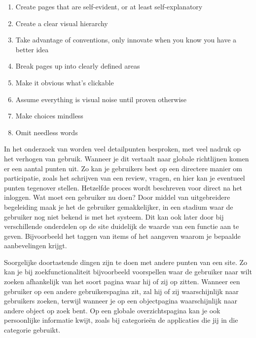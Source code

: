 \documentclass[a4paper, 10pt, pdftex]{report}
\begin{document}
      \begin{enumerate}
        \item Create pages that are self-evident, or at least self-explanatory
        \item Create a clear visual hierarchy
        \item Take advantage of conventions, only innovate when you know you have a better idea
        \item Break pages up into clearly defined areas
        \item Make it obvious what's clickable
        \item Assume everything is visual noise until proven otherwise
        \item Make choices mindless
        \item Omit needless words
      \end{enumerate}

    In het onderzoek van \citeauthor{Alfrink2008} worden veel detailpunten besproken, met veel nadruk op het verhogen van gebruik. Wanneer je dit vertaalt naar globale richtlijnen komen er een aantal punten uit. Zo kan je gebruikers best op een directere manier om participatie, zoals het schrijven van een review, vragen, en hier kan je eventueel punten tegenover stellen. Hetzelfde proces wordt beschreven voor direct na het inloggen. Wat moet een gebruiker nu doen? Door middel van uitgebreidere begeleiding maak je het de gebruiker gemakkelijker, in een stadium waar de gebruiker nog niet bekend is met het systeem. Dit kan ook later door bij verschillende onderdelen op de site duidelijk de waarde van een functie aan te geven. Bijvoorbeeld het taggen van items of het aangeven waarom je bepaalde aanbevelingen krijgt.

    Soorgelijke doortastende dingen zijn te doen met andere punten van een site. Zo kan je bij zoekfunctionaliteit bijvoorbeeld voorspellen waar de gebruiker naar wilt zoeken afhankelijk van het soort pagina waar hij of zij op zitten. Wanneer een gebruiker op een andere gebruikerspagina zit, zal hij of zij waarschijnlijk naar gebruikers zoeken, terwijl wanneer je op een objectpagina waarschijnlijk naar andere object op zoek bent. Op een globale overzichtspagina kan je ook persoonlijke informatie kwijt, zoals bij categorie\"en de applicaties die jij in die categorie gebruikt.
\end{document}

